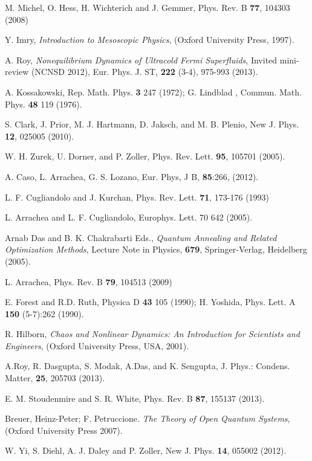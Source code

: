 \documentclass[a4paper,11pt,color]{article}
\renewenvironment{thebibliography}[1]{%
    \begin{oldthebibliography}{#1}%
      \setlength{\parskip}{0ex}%
      \setlength{\itemsep}{0ex}%
  }%
  {%
    \end{oldthebibliography}%
  }
\begin{document}
\begin{thebibliography}{}
M. Michel, O. Hess,  H. Wichterich and J. Gemmer, Phys. Rev. B {\bf 77}, 104303 (2008) 

Y. Imry, \textit{Introduction to Mesoscopic Physics}, (Oxford University Press, 1997).

A. Roy, \textit{Nonequilibrium Dynamics of Ultracold Fermi Superfluids}, Invited mini-review (NCNSD $2012$),
Eur. Phys. J. ST, {\bf 222} (3-4), 975-993 (2013).

A. Kossakowski, Rep. Math. Phys. {\bf 3} 247 (1972); G. Lindblad , Commun. Math. Phys. {\bf 48} 119 (1976).

S. Clark, J. Prior, M. J. Hartmann, D. Jaksch, and M. B. Plenio, New J. Phys. {\bf 12}, 025005 (2010).

W. H. Zurek, U. Dorner, and P. Zoller, Phys. Rev. Lett. {\bf 95}, 105701 (2005).

A. Caso, L. Arrachea, G. S. Lozano, Eur. Phys, J B, {\bf 85}:266, (2012).

L. F. Cugliandolo and J. Kurchan, Phys. Rev. Lett. {\bf 71}, 173-176 (1993) 

L. Arrachea and L. F. Cugliandolo, Europhys. Lett. 70 642 (2005).

Arnab Das and B. K. Chakrabarti Eds., \textit{Quantum Annealing and Related Optimization Methods}, Lecture Note in Physics, {\bf 679}, Springer-Verlag, Heidelberg (2005).

L. Arrachea, Phys. Rev. B {\bf 79}, 104513 (2009) 

E. Forest and R.D. Ruth, Physica D {\bf 43} 105 (1990); H. Yoshida, Phys. Lett. A {\bf 150} (5-7):262 (1990).

R. Hilborn, \textit{Chaos and Nonlinear Dynamics: An Introduction for Scientists and Engineers}, (Oxford University Press, USA, 2001).

A.Roy, R. Dasgupta, S. Modak, A.Das, and K. Sengupta,  J. Phys.: Condens. Matter, {\bf 25}, 205703 (2013).

E. M. Stoudenmire and S. R. White, Phys. Rev. B {\bf 87}, 155137 (2013).

Breuer, Heinz-Peter; F. Petruccione. \textit{The Theory of Open Quantum Systems}, (Oxford University Press 2007).

W. Yi, S. Diehl, A. J. Daley and P. Zoller, New J. Phys. {\bf 14}, 055002 (2012).


\end{thebibliography}
\end{document}
